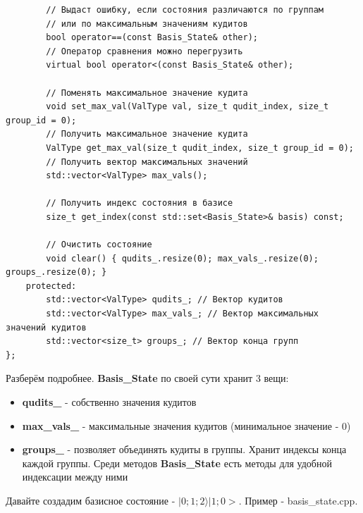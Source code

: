 \documentclass[12pt,fleqn]{article}
\begin{document}
\begin{mdframed}[linecolor=black, topline=true, bottomline=true,
    leftline=false, rightline=false]
\begin{verbatim}
        // Выдаст ошибку, если состояния различаются по группам
        // или по максимальным значениям кудитов
        bool operator==(const Basis_State& other);
        // Оператор сравнения можно перегрузить
        virtual bool operator<(const Basis_State& other);
        
        // Поменять максимальное значение кудита
        void set_max_val(ValType val, size_t qudit_index, size_t group_id = 0);
        // Получить максимальное значение кудита
        ValType get_max_val(size_t qudit_index, size_t group_id = 0);
        // Получить вектор максимальных значений
        std::vector<ValType> max_vals();

        // Получить индекс состояния в базисе
        size_t get_index(const std::set<Basis_State>& basis) const;

        // Очистить состояние
        void clear() { qudits_.resize(0); max_vals_.resize(0); groups_.resize(0); }
    protected:
        std::vector<ValType> qudits_; // Вектор кудитов
        std::vector<ValType> max_vals_; // Вектор максимальных значений кудитов
        std::vector<size_t> groups_; // Вектор конца групп
};

\end{verbatim}
\end{mdframed}

        Разберём подробнее. \textbf{Basis\_State} по своей сути хранит 3 вещи:
        \begin{itemize}
            \item{\textbf{qudits\_} - собственно значения кудитов}
            \item{\textbf{max\_vals\_} - максимальные значения кудитов (минимальное значение - 0)}
            \item{\textbf{groups\_} - позволяет объединять кудиты в группы. Хранит индексы конца каждой группы. Среди методов \textbf{Basis\_State} есть методы для удобной индексации между ними}
        \end{itemize}

        Давайте создадим базисное состояние - $|0;1;2\rangle|1;0>$. Пример - \textsf{basis\_state.cpp}.
\end{document}
